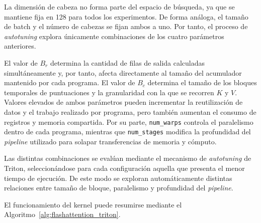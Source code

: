 La dimensión de cabeza no forma parte del espacio de búsqueda, ya que se mantiene fija en 128 para todos los experimentos. De forma análoga, el tamaño de batch y el número de cabezas se fijan ambos a uno. Por tanto, el proceso de \textit{autotuning} explora únicamente combinaciones de los cuatro parámetros anteriores.

El valor de \(B_r\) determina la cantidad de filas de salida calculadas simultáneamente y, por tanto, afecta directamente al tamaño del acumulador mantenido por cada programa. El valor de \(B_c\) determina el tamaño de los bloques temporales de puntuaciones y la granularidad con la que se recorren \(K\) y \(V\). Valores elevados de ambos parámetros pueden incrementar la reutilización de datos y el trabajo realizado por programa, pero también aumentan el consumo de registros y memoria compartida. Por su parte, \texttt{num\_warps} controla el paralelismo dentro de cada programa, mientras que \texttt{num\_stages} modifica la profundidad del \textit{pipeline} utilizado para solapar transferencias de memoria y cómputo.

Las distintas combinaciones se evalúan mediante el mecanismo de \textit{autotuning} de Triton, seleccionándose para cada configuración aquella que presenta el menor tiempo de ejecución. De este modo se exploran automáticamente distintas relaciones entre tamaño de bloque, paralelismo y profundidad del \textit{pipeline}.

El funcionamiento del kernel puede resumirse mediante el Algoritmo~\ref{alg:flashattention_triton}.

